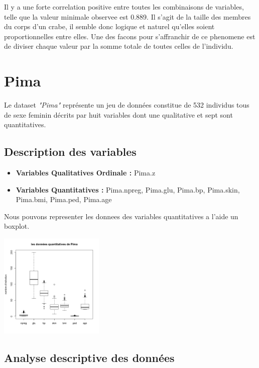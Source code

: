 \documentclass[]{report}
\begin{document}
Il y a une forte correlation positive entre toutes les combinaisons de variables, telle que la valeur minimale observee est 0.889. 
Il s'agit de la taille des membres du corps d'un crabe, il semble donc logique et naturel qu'elles soient proportionnelles entre elles.
Une des facons pour s'affranchir de ce phenomene est de diviser chaque valeur par la somme totale de toutes celles de l'individu.

\section{Pima}
Le dataset \textit{"Pima"} représente un jeu de données constitue de 532 individus tous de sexe feminin décrits par huit variables dont une qualitative et sept sont quantitatives.

\subsection{Description des variables}


\begin{itemize}
	\item \textbf{Variables Qualitatives Ordinale :}  Pima.z
	\item \textbf{Variables Quantitatives : } Pima.npreg, Pima.glu, Pima.bp, Pima.skin, Pima.bmi, Pima.ped, Pima.age
\end{itemize}

Nous pouvons representer les donnees des variables quantitatives a l'aide un boxplot.
\begin{center}
	\includegraphics[width=50mm]{Figures/Pima/bxp_Pimaquant.png}
	\label{fig:boxplot_pima_quantitatives}
\end{center}

\subsection{Analyse descriptive des données}
\end{document}
